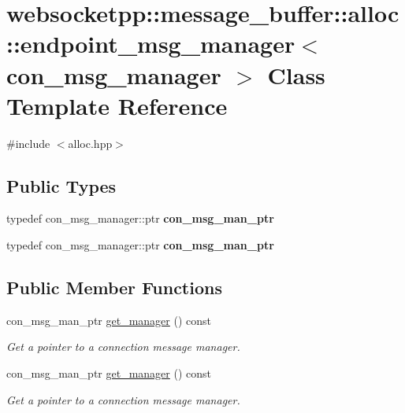 \hypertarget{classwebsocketpp_1_1message__buffer_1_1alloc_1_1endpoint__msg__manager}{}\section{websocketpp\+:\+:message\+\_\+buffer\+:\+:alloc\+:\+:endpoint\+\_\+msg\+\_\+manager$<$ con\+\_\+msg\+\_\+manager $>$ Class Template Reference}
\label{classwebsocketpp_1_1message__buffer_1_1alloc_1_1endpoint__msg__manager}


{\ttfamily \#include $<$alloc.\+hpp$>$}

\subsection*{Public Types}
\begin{DoxyCompactItemize}
\item 
\mbox{\label{classwebsocketpp_1_1message__buffer_1_1alloc_1_1endpoint__msg__manager_aa850684cf613468b4c6bb1497dcb2f52}} 
typedef con\+\_\+msg\+\_\+manager\+::ptr {\bfseries con\+\_\+msg\+\_\+man\+\_\+ptr}
\item 
\mbox{\label{classwebsocketpp_1_1message__buffer_1_1alloc_1_1endpoint__msg__manager_aa850684cf613468b4c6bb1497dcb2f52}} 
typedef con\+\_\+msg\+\_\+manager\+::ptr {\bfseries con\+\_\+msg\+\_\+man\+\_\+ptr}
\end{DoxyCompactItemize}
\subsection*{Public Member Functions}
\begin{DoxyCompactItemize}
\item 
con\+\_\+msg\+\_\+man\+\_\+ptr \mbox{\hyperlink{classwebsocketpp_1_1message__buffer_1_1alloc_1_1endpoint__msg__manager_a58c3cece7c5122cfabb4f0071cd9ced4}{get\+\_\+manager}} () const
\begin{DoxyCompactList}\small\item\em Get a pointer to a connection message manager. \end{DoxyCompactList}\item 
con\+\_\+msg\+\_\+man\+\_\+ptr \mbox{\hyperlink{classwebsocketpp_1_1message__buffer_1_1alloc_1_1endpoint__msg__manager_a58c3cece7c5122cfabb4f0071cd9ced4}{get\+\_\+manager}} () const
\begin{DoxyCompactList}\small\item\em Get a pointer to a connection message manager. \end{DoxyCompactList}\end{DoxyCompactItemize}


